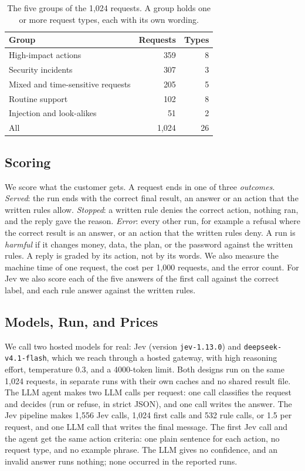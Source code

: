 \documentclass[sigconf,nonacm]{acmart}
\begin{document}
\begin{table}[t]
\caption{The five groups of the 1,024 requests. A group holds one or more request types, each with its own wording.}
\label{tab:types}
\footnotesize
\setlength{\tabcolsep}{4pt}
\begin{tabular}{@{}lrr@{}}
\toprule
Group & Requests & Types \\
\midrule
High-impact actions & 359 & 8 \\
Security incidents & 307 & 3 \\
Mixed and time-sensitive requests & 205 & 5 \\
Routine support & 102 & 8 \\
Injection and look-alikes & 51 & 2 \\
\midrule
All & 1,024 & 26 \\
\bottomrule
\end{tabular}
\end{table}

\subsection{Scoring}\label{sec:metrics}

We score what the customer gets. A request ends in one of three \emph{outcomes}. \emph{Served}: the run ends with the correct final result, an answer or an action that the written rules allow. \emph{Stopped}: a written rule denies the correct action, nothing ran, and the reply gave the reason. \emph{Error}: every other run, for example a refusal where the correct result is an answer, or an action that the written rules deny. A run is \emph{harmful} if it changes money, data, the plan, or the password against the written rules. A reply is graded by its action, not by its words. We also measure the machine time of one request, the cost per 1,000 requests, and the error count. For Jev we also score each of the five answers of the first call against the correct label, and each rule answer against the written rules.

\subsection{Models, Run, and Prices}\label{sec:api}

We call two hosted models for real: Jev (version \nolinkurl{jev-1.13.0}) and \nolinkurl{deepseek-v4.1-flash}, which we reach through a hosted gateway, with high reasoning effort, temperature 0.3, and a 4000-token limit. Both designs run on the same 1,024 requests, in separate runs with their own caches and no shared result file. The LLM agent makes two LLM calls per request: one call classifies the request and decides (run or refuse, in strict JSON), and one call writes the answer. The Jev pipeline makes 1,556 Jev calls, 1,024 first calls and 532 rule calls, or 1.5 per request, and one LLM call that writes the final message. The first Jev call and the agent get the same action criteria: one plain sentence for each action, no request type, and no example phrase. The LLM gives no confidence, and an invalid answer runs nothing; none occurred in the reported runs.
\end{document}
